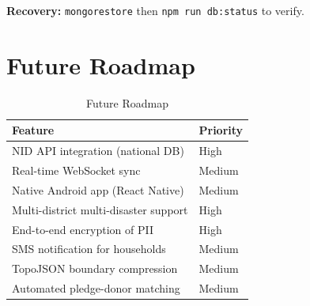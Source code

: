 \textbf{Recovery:} \texttt{mongorestore} then \texttt{npm run db:status} to verify.

\section{Future Roadmap}
\begin{table}[H]
\centering
\caption{Future Roadmap}
\label{tab:roadmap}
\begin{tabularx}{\textwidth}{@{}lX@{}}
\toprule
Feature & Priority \\
\midrule
NID API integration (national DB) & High \\
Real-time WebSocket sync & Medium \\
Native Android app (React Native) & Medium \\
Multi-district multi-disaster support & High \\
End-to-end encryption of PII & High \\
SMS notification for households & Medium \\
TopoJSON boundary compression & Medium \\
Automated pledge-donor matching & Medium \\
\bottomrule
\end{tabularx}
\end{table}
